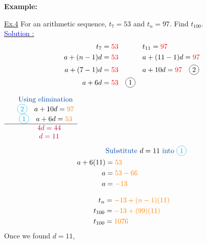 \documentclass[12pt,a4paper]{article}
\newcommand*\circled[1]{\tikz[baseline=(char.base)]{
            \node[shape=circle,draw,inner sep=2pt] (char) {#1};}}
\newenvironment{example}
  {\begin{framed}\colorbox{examplecolor}{
  \parbox{\dimexpr\linewidth-2\fboxsep}{
  \textbf{Example:}}}}
  {\end{framed}}
\begin{document}
\begin{example}
    \underline{Ex.4} For an arithmetic sequence, $t_7=53$ and $t_n=97$. Find $t_{100}$.\\
    \underline{\textcolor{blue}{Solution \circled{1} :}}
    \begin{align*}
        t_7 &= \textcolor{red}{53} \quad && t_{11} = \textcolor{red}{97}  \\
        a + (n-1)d &= \textcolor{red}{53} \quad && a + (11-1)d = \textcolor{red}{97}  \\
        a + (7-1)d &= \textcolor{red}{53} \quad && a + 10d = \textcolor{red}{97} \quad \circled{2} \\
        a + 6d &= \textcolor{red}{53} \quad \circled{1}
    \end{align*}
  \begin{minipage}[t]{0.48\textwidth}
        $\begin{array}{ccccc}
             & \textcolor{blue}{\text{Using elimination}} \\
             & \textcolor{cyan}{\circled{2}} \quad a + 10d = \textcolor{orange}{97} \\
             & \textcolor{cyan}{\circled{1}} \quad a + 6d = \textcolor{orange}{53} \\
             \hline \
             & \quad \textcolor{purple}{4d = 44} \\
             & \quad \textcolor{purple}{d = 11}
        \end{array}$
        \begin{align*}
            &\textcolor{blue}{\text{Substitute }} d=11 \textcolor{blue}{\text{ into }} \textcolor{cyan}{\circled{1}} \\
            a + 6(11) &= \textcolor{orange}{53} \\
            a &= \textcolor{orange}{53 - 66} \\
            a &= \textcolor{orange}{-13}
        \end{align*}
    \end{minipage}%
    \begin{minipage}[t]{0.48\textwidth}
        \begin{align*}
            t_n &= \textcolor{orange}{-13 + (n-1)(11)} \\
            t_{100} &= \textcolor{orange}{-13 + (99)(11)} \\
            t_{100} &= \textcolor{orange}{1076} \\
        \end{align*}
        Once we found $d=11$,

\end{minipage}
\end{example}
\end{document}
